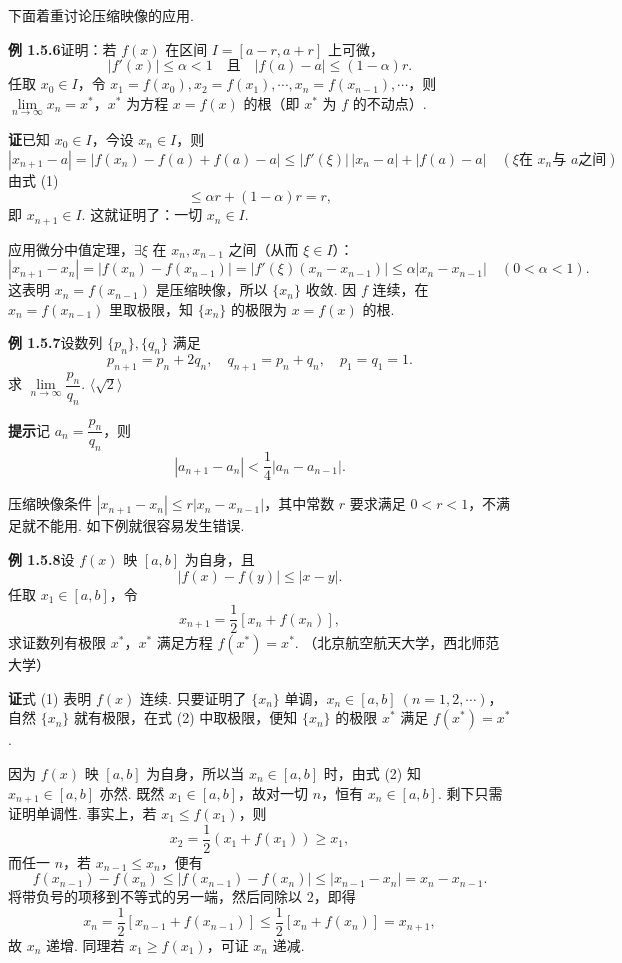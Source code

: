 \documentclass[UTF8,12pt,a4paper,fontset=fandol]{ctexart}
\begin{document}
下面着重讨论压缩映像的应用.

\noindent\textbf{例 1.5.6}\quad 证明：若 $f(x)$ 在区间 $I=[a-r,a+r]$ 上可微，
\[
  |f'(x)|\le \alpha<1\quad \text{且}\quad |f(a)-a|\le (1-\alpha)r.
\tag{1}
\]
任取 $x_0\in I$，令 $x_1=f(x_0),x_2=f(x_1),\cdots,x_n=f(x_{n-1}),\cdots$，则 $\lim\limits_{n\to\infty}x_n=x^*$，$x^*$ 为方程 $x=f(x)$ 的根（即 $x^*$ 为 $f$ 的不动点）.

\noindent\textbf{证}\quad 已知 $x_0\in I$，今设 $x_n\in I$，则
\[
  |x_{n+1}-a|
  =|f(x_n)-f(a)+f(a)-a|
  \le |f'(\xi)|\,|x_n-a|+|f(a)-a|\quad (\xi \text{在 }x_n\text{与 }a\text{之间})
\]
由式 (1)
\[
  \le \alpha r+(1-\alpha)r=r,
\]
即 $x_{n+1}\in I$. 这就证明了：一切 $x_n\in I$.

应用微分中值定理，$\exists \xi$ 在 $x_n,x_{n-1}$ 之间（从而 $\xi\in I$）：
\[
  |x_{n+1}-x_n|
  =|f(x_n)-f(x_{n-1})|
  =|f'(\xi)(x_n-x_{n-1})|
  \le \alpha |x_n-x_{n-1}|\quad (0<\alpha<1).
\]
这表明 $x_n=f(x_{n-1})$ 是压缩映像，所以 $\{x_n\}$ 收敛. 因 $f$ 连续，在 $x_n=f(x_{n-1})$ 里取极限，知 $\{x_n\}$ 的极限为 $x=f(x)$ 的根.

\noindent\textbf{例 1.5.7}\quad 设数列 $\{p_n\},\{q_n\}$ 满足
\[
  p_{n+1}=p_n+2q_n,\quad q_{n+1}=p_n+q_n,\quad p_1=q_1=1.
\]
求 $\lim\limits_{n\to\infty}\dfrac{p_n}{q_n}$. \hfill $\langle\sqrt2\rangle$

\noindent\textbf{提示}\quad 记 $a_n=\dfrac{p_n}{q_n}$，则
\[
  |a_{n+1}-a_n|<\frac14 |a_n-a_{n-1}|.
\]

压缩映像条件 $|x_{n+1}-x_n|\le r|x_n-x_{n-1}|$，其中常数 $r$ 要求满足 $0<r<1$，不满足就不能用. 如下例就很容易发生错误.

\noindent\textbf{例 1.5.8}\quad 设 $f(x)$ 映 $[a,b]$ 为自身，且
\[
  |f(x)-f(y)|\le |x-y|.
\tag{1}
\]
任取 $x_1\in [a,b]$，令
\[
  x_{n+1}=\frac12[x_n+f(x_n)],
\tag{2}
\]
求证数列有极限 $x^*$，$x^*$ 满足方程 $f(x^*)=x^*$. （北京航空航天大学，西北师范大学）

\noindent\textbf{证}\quad 式 (1) 表明 $f(x)$ 连续. 只要证明了 $\{x_n\}$ 单调，$x_n\in [a,b]\ (n=1,2,\cdots)$，自然 $\{x_n\}$ 就有极限，在式 (2) 中取极限，便知 $\{x_n\}$ 的极限 $x^*$ 满足 $f(x^*)=x^*$.

因为 $f(x)$ 映 $[a,b]$ 为自身，所以当 $x_n\in [a,b]$ 时，由式 (2) 知 $x_{n+1}\in [a,b]$ 亦然. 既然 $x_1\in [a,b]$，故对一切 $n$，恒有 $x_n\in [a,b]$. 剩下只需证明单调性. 事实上，若 $x_1\le f(x_1)$，则
\[
  x_2=\frac12(x_1+f(x_1))\ge x_1,
\]
而任一 $n$，若 $x_{n-1}\le x_n$，便有
\[
  f(x_{n-1})-f(x_n)\le |f(x_{n-1})-f(x_n)|
  \le |x_{n-1}-x_n|=x_n-x_{n-1}.
\]
将带负号的项移到不等式的另一端，然后同除以 $2$，即得
\[
  x_n=\frac12[x_{n-1}+f(x_{n-1})]\le \frac12[x_n+f(x_n)]=x_{n+1},
\]
故 $x_n$ 递增. 同理若 $x_1\ge f(x_1)$，可证 $x_n$ 递减.
\end{document}
